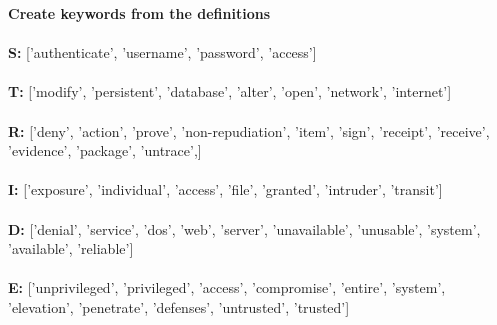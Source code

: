\textbf{Create keywords from the definitions}\\\\
\textbf{S:} ['authenticate', 'username', 'password', 'access'] \\\\
\textbf{T:} ['modify', 'persistent', 'database', 'alter', 'open', 'network', 'internet'] \\\\ %
\textbf{R:} ['deny', 'action', 'prove', 'non-repudiation', 'item', 'sign', 'receipt', 'receive', 'evidence', 'package', 'untrace',] \\\\
\textbf{I:} ['exposure', 'individual', 'access', 'file', 'granted', 'intruder', 'transit'] \\\\
\textbf{D:} ['denial', 'service', 'dos', 'web', 'server', 'unavailable', 'unusable', 'system', 'available', 'reliable'] \\\\
\textbf{E:} ['unprivileged', 'privileged', 'access', 'compromise', 'entire', 'system', 'elevation', 'penetrate', 'defenses', 'untrusted', 'trusted'] \\\\